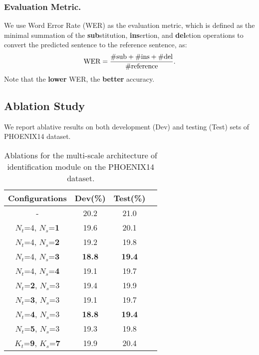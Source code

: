 \documentclass[10pt,twocolumn,letterpaper]{article}
\begin{document}
\subsubsection{Evaluation Metric.} We use Word Error Rate (WER) as the evaluation metric, which is defined as the minimal summation of the \textbf{sub}stitution, \textbf{ins}ertion, and \textbf{del}etion operations to convert the predicted sentence to the reference sentence, as:
\begin{equation}
\label{e11}
\rm WER = \frac{ \#sub+\#ins+\#del}{\#reference}.
\end{equation}
Note that the \textbf{lower} WER, the \textbf{better} accuracy.

\subsection{Ablation Study}
We report ablative results on both development (Dev) and testing (Test) sets of PHOENIX14 dataset.

\begin{table}[t]   
  \centering
  \begin{tabular}{cccc}
  \hline
  Configurations & Dev(\%) & Test(\%)\\
  \hline
  - & 20.2 & 21.0\\
  \hline
  $N_t$=4, $N_s$=\textbf{1}  & 19.6  & 20.1\\
  $N_t$=4, $N_s$=\textbf{2} & 19.2 & 19.8 \\
  $N_t$=4, $N_s$=\textbf{3} & \textbf{18.8} & \textbf{19.4} \\
  $N_t$=4, $N_s$=\textbf{4}  & 19.1  &19.7 \\
  \hline
  $N_t$=\textbf{2}, $N_s$=3 & 19.4  & 19.9 \\
  $N_t$=\textbf{3}, $N_s$=3 & 19.1  & 19.7 \\
  $N_t$=\textbf{4}, $N_s$=3 & \textbf{18.8} & \textbf{19.4} \\
  $N_t$=\textbf{5}, $N_s$=3  & 19.3 & 19.8 \\
  \hline
  $K_t$=\textbf{9}, $K_s$=\textbf{7} & 19.9 & 20.4 \\
  \hline
  \end{tabular}
  \caption{Ablations for the multi-scale architecture of identification module on the PHOENIX14 dataset.} 
  \label{tab1} 
  \end{table}
\end{document}
